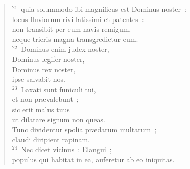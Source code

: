 \begin{flushleft}
\begin{verse}
${}^{21}$~quia solummodo ibi magnificus est Dominus noster~:\\ locus fluviorum rivi latissimi et patentes~:\\ non transibit per eum navis remigum,\\ neque trieris magna transgredietur eum.\\
${}^{22}$~Dominus enim judex noster,\\ Dominus legifer noster,\\ Dominus rex noster,\\ ipse salvabit nos.\\
${}^{23}$~Laxati sunt funiculi tui,\\ et non pr\ae valebunt~;\\ sic erit malus tuus\\ ut dilatare signum non queas.\\ Tunc dividentur spolia pr\ae darum multarum~;\\ claudi diripient rapinam.\\
${}^{24}$~Nec dicet vicinus~: Elangui~;\\ populus qui habitat in ea, auferetur ab eo iniquitas.\end{verse}\end{flushleft}



